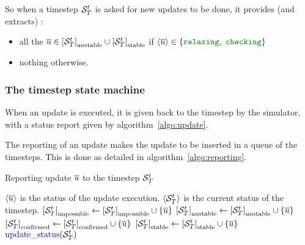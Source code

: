 So when a timestep $\cxDftTS$ is asked for new updates to be done, it provides (and extracts) :
\begin{itemize}
\item all the $\cxJobsA$ if $\cxJobsB$
\item nothing otherwise.
\end{itemize}


\subsubsection{The timestep state machine}

When an update is executed, it is given back to the timestep by the simulator, with a status report given by algorithm~\ref{algo:update}.

The reporting of an update makes the update to be inserted in a queue of the timesteps. This is done as detailed in algorithm~\ref{algo:reporting}.


\begin{algorithm}
  \caption{Reporting update $\cxTSUpdt$ to the timestep $\cxDftTS$\label{algo:reporting}}
  \begin{algorithmic}[1]
    \REQUIRE $\cxStatusTSUpdt$ is the status of the update execution.
    \REQUIRE $\cxStatusTS$ is the current status of the timestep.
    \IF    {$\cxStatusTSUpdtImpossible$} \STATE $\cxReportA$
    \ELSIF {$\cxStatusTSUpdtUpdated$}    \STATE $\cxReportB$
    \ELSIF {$\cxStatusTSUpdtDone$}       \STATE {}
    \ELSIF {$\cxStatusTSUpdtUpToDate$}
    \STATE $\cxReportE$
    \ELSE
    \STATE $\cxReportF$
    \ENDIF
    \ENDIF
    \STATE $\cxReportG$ 
  \end{algorithmic}
\end{algorithm}


